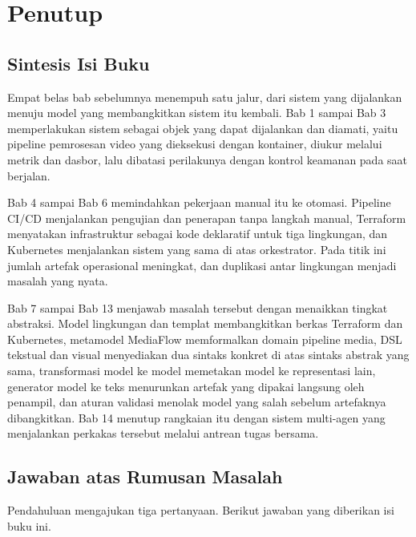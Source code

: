 \chapter{Penutup}

\section*{Sintesis Isi Buku}

Empat belas bab sebelumnya menempuh satu jalur, dari sistem yang dijalankan
menuju model yang membangkitkan sistem itu kembali. Bab 1 sampai Bab 3
memperlakukan sistem sebagai objek yang dapat dijalankan dan diamati, yaitu
pipeline pemrosesan video yang dieksekusi dengan kontainer, diukur melalui metrik
dan dasbor, lalu dibatasi perilakunya dengan kontrol keamanan pada saat berjalan.

Bab 4 sampai Bab 6 memindahkan pekerjaan manual itu ke otomasi. Pipeline CI/CD
menjalankan pengujian dan penerapan tanpa langkah manual, Terraform menyatakan
infrastruktur sebagai kode deklaratif untuk tiga lingkungan, dan Kubernetes
menjalankan sistem yang sama di atas orkestrator. Pada titik ini jumlah artefak
operasional meningkat, dan duplikasi antar lingkungan menjadi masalah yang nyata.

Bab 7 sampai Bab 13 menjawab masalah tersebut dengan menaikkan tingkat
abstraksi. Model lingkungan dan templat membangkitkan berkas Terraform dan
Kubernetes, metamodel MediaFlow memformalkan domain pipeline media, DSL tekstual
dan visual menyediakan dua sintaks konkret di atas sintaks abstrak yang sama,
transformasi model ke model memetakan model ke representasi lain, generator model
ke teks menurunkan artefak yang dipakai langsung oleh penampil, dan aturan
validasi menolak model yang salah sebelum artefaknya dibangkitkan. Bab 14
menutup rangkaian itu dengan sistem multi-agen yang menjalankan perkakas tersebut
melalui antrean tugas bersama.

\section*{Jawaban atas Rumusan Masalah}

Pendahuluan mengajukan tiga pertanyaan. Berikut jawaban yang diberikan isi buku
ini.

